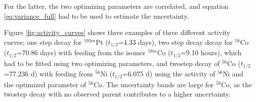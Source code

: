 For the latter, the two optimizing parameters are correlated, and equation \ref{eq:variance_full} had to be used to estimate the uncertainty. 



\noindent 
Figure \ref{fig:activity_curves} shows three examples of three different activity curves; one step decay for $^{193m}$Pt ($t_{1/2}$=4.33 days), two step decay decay for $^{58}$Co ($t_{1/2}$=70.86 days) with feeding from the isomer $^{58m}$Co ($t_{1/2}$=9.10 hours), which had to be fitted using two optimizing parameters, and twostep decay of $^{56}$Co ($t_{1/2}$=77.236 d) with feeding from $^{56}$Ni ($t_{1/2}$=6.075 d) using the activity of $^{56}$Ni and the optimized parameter of $^{56}$Co. The uncertainty bands are large for $^{58}$Co, as the twostep decay with no observed parent contributes to a higher uncertainty.


